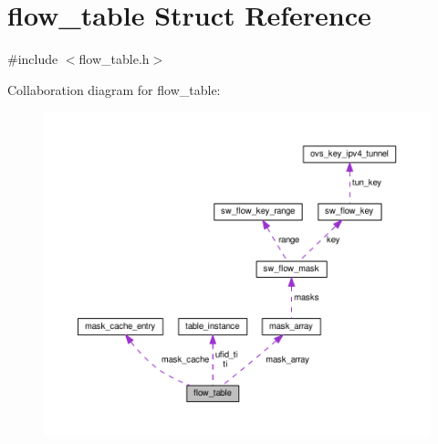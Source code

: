 \hypertarget{structflow__table}{}\section{flow\+\_\+table Struct Reference}
\label{structflow__table}


{\ttfamily \#include $<$flow\+\_\+table.\+h$>$}



Collaboration diagram for flow\+\_\+table\+:
\nopagebreak
\begin{figure}[H]
\begin{center}
\leavevmode
\includegraphics[width=350pt]{structflow__table__coll__graph}
\end{center}
\end{figure}
